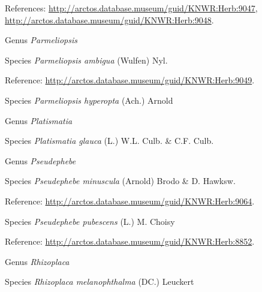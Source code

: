 \documentclass[9pt, article]{memoir}
\begin{document}
\begin{multicols}{2}
\vspace{6pt}References: 
\url{http://arctos.database.museum/guid/KNWR:Herb:9047}, 
\url{http://arctos.database.museum/guid/KNWR:Herb:9048}.

\vspace{6pt}\noindent\hspace{30pt}Genus \textit{Parmeliopsis}


\vspace{6pt}\noindent\hspace{36pt}Species \textit{Parmeliopsis ambigua} (Wulfen) Nyl.


\vspace{6pt}Reference: 
\url{http://arctos.database.museum/guid/KNWR:Herb:9049}.

\vspace{6pt}\noindent\hspace{36pt}Species \textit{Parmeliopsis hyperopta} (Ach.) Arnold


\vspace{6pt}\noindent\hspace{30pt}Genus \textit{Platismatia}


\vspace{6pt}\noindent\hspace{36pt}Species \textit{Platismatia glauca} (L.) W.L. Culb. \& C.F. Culb.


\vspace{6pt}\noindent\hspace{30pt}Genus \textit{Pseudephebe}


\vspace{6pt}\noindent\hspace{36pt}Species \textit{Pseudephebe minuscula} (Arnold) Brodo \& D. Hawksw.


\vspace{6pt}Reference: 
\url{http://arctos.database.museum/guid/KNWR:Herb:9064}.

\vspace{6pt}\noindent\hspace{36pt}Species \textit{Pseudephebe pubescens} (L.) M. Choisy


\vspace{6pt}Reference: 
\url{http://arctos.database.museum/guid/KNWR:Herb:8852}.

\vspace{6pt}\noindent\hspace{30pt}Genus \textit{Rhizoplaca}


\vspace{6pt}\noindent\hspace{36pt}Species \textit{Rhizoplaca melanophthalma} (DC.) Leuckert



\end{multicols}
\end{document}

